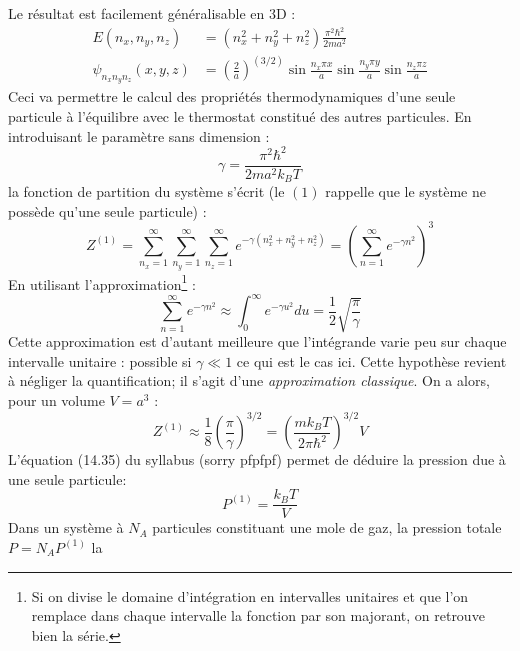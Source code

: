 \documentclass[british,french,11pt, a4paper, openany]{book}
\begin{document}
Le résultat est facilement généralisable en 3D :
\begin{equation}
	\begin{array}{ll}
		E(n_x,n_y,n_z)          & = (n_x^2 +n_y^2+n_z^2)\frac{\pi^2\hbar^2}{2ma^2}                                        \\
		\psi_{n_xn_yn_z}(x,y,z) & = (\frac{2}{a})^(3/2)\sin\frac{n_x\pi x}{a}\sin\frac{n_y\pi y}{a}\sin\frac{n_z\pi z}{a} 
	\end{array} 
\end{equation}
Ceci va permettre le calcul des propriétés thermodynamiques d'une seule particule à l'équilibre avec
le thermostat constitué des autres particules. En introduisant le paramètre sans dimension :
\begin{equation}
	\gamma = \dfrac{\pi^2\hbar^2}{2ma^2k_BT}
\end{equation} 
la fonction de partition du système s'écrit (le $(1)$ rappelle que le système ne possède qu'une
seule particule) :
\begin{equation}
	Z^{(1)} = \sum_{n_x=1}^\infty\sum_{n_y=1}^\infty\sum_{n_z=1}^\infty e^{-\gamma(n_x^2 +n_y^2+n_z^2)}
	= \left(\sum_{n=1}^\infty e^{-\gamma n^2}\right)^3
\end{equation}
En utilisant l'approximation\footnote{Si on divise le domaine d'intégration en intervalles unitaires et
	que l'on remplace dans chaque intervalle la fonction par son majorant, on retrouve bien la série.} :
\begin{equation}
	\sum_{n=1}^\infty e^{-\gamma n^2} \approx \int_0^\infty e^{-\gamma u^2}du = \dfrac{1}{2}\sqrt{\dfrac{\pi}
		{\gamma}}
	\label{eq:ApproxSerie}
\end{equation}
Cette approximation est d'autant meilleure que l’intégrande varie peu sur chaque intervalle unitaire :
possible si $\gamma \ll 1$ ce qui est le cas ici. Cette hypothèse revient à négliger la quantification;
il s'agit d'une \textit{approximation classique}. On a alors, pour un volume $V=a^3$ :
\begin{equation}
	Z^{(1)} \approx \dfrac{1}{8}\left(\dfrac{\pi}{\gamma}\right)^{3/2} = \left(\dfrac{mk_BT}{2\pi\hbar^2}
	\right)^{3/2}V
	\label{eq:z1}
\end{equation}
L'équation (14.35) du syllabus (sorry pfpfpf) permet de déduire la pression due à une seule particule:
\begin{equation}
	P^{(1)} = \dfrac{k_BT}{V}
\end{equation}
Dans un système à  $N_A$ particules constituant une mole de gaz, la pression totale $P = N_AP^{(1)}$ la
\end{document}
